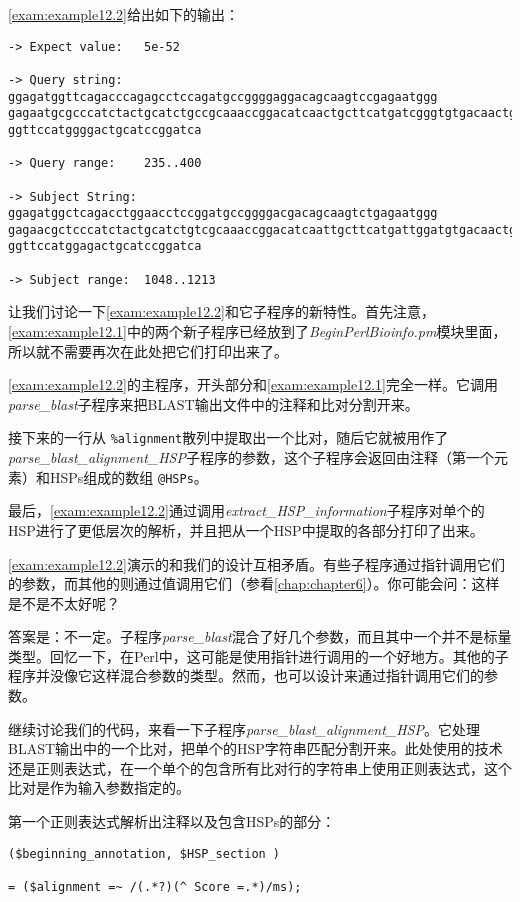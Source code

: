 \autoref{exam:example12.2}给出如下的输出：

\begin{lstlisting}
-> Expect value:   5e-52

-> Query string:   ggagatggttcagacccagagcctccagatgccggggaggacagcaagtccgagaatggg
gagaatgcgcccatctactgcatctgccgcaaaccggacatcaactgcttcatgatcgggtgtgacaactgcaatgagt
ggttccatggggactgcatccggatca

-> Query range:    235..400

-> Subject String: ggagatggctcagacctggaacctccggatgccggggacgacagcaagtctgagaatggg
gagaacgctcccatctactgcatctgtcgcaaaccggacatcaattgcttcatgattggatgtgacaactgcaacgagt
ggttccatggagactgcatccggatca

-> Subject range:  1048..1213
\end{lstlisting}

让我们讨论一下\autoref{exam:example12.2}和它子程序的新特性。首先注意，\autoref{exam:example12.1}中的两个新子程序已经放到了\textit{BeginPerlBioinfo.pm}模块里面，所以就不需要再次在此处把它们打印出来了。

\autoref{exam:example12.2}的主程序，开头部分和\autoref{exam:example12.1}完全一样。它调用\textit{parse\_blast}子程序来把BLAST输出文件中的注释和比对分割开来。

接下来的一行从 \verb|%alignment|散列中提取出一个比对，随后它就被用作了\textit{parse\_blast\_alignment\_HSP}子程序的参数，这个子程序会返回由注释（第一个元素）和HSPs组成的数组 \verb|@HSPs|。

最后，\autoref{exam:example12.2}通过调用\textit{extract\_HSP\_information}子程序对单个的HSP进行了更低层次的解析，并且把从一个HSP中提取的各部分打印了出来。

\autoref{exam:example12.2}演示的和我们的设计互相矛盾。有些子程序通过指针调用它们的参数，而其他的则通过值调用它们（参看\autoref{chap:chapter6}）。你可能会问：这样是不是不太好呢？

答案是：不一定。子程序\textit{parse\_blast}混合了好几个参数，而且其中一个并不是标量类型。回忆一下，在Perl中，这可能是使用指针进行调用的一个好地方。其他的子程序并没像它这样混合参数的类型。然而，也可以设计来通过指针调用它们的参数。

继续讨论我们的代码，来看一下子程序\textit{parse\_blast\_alignment\_HSP}。它处理BLAST输出中的一个比对，把单个的HSP字符串匹配分割开来。此处使用的技术还是正则表达式，在一个单个的包含所有比对行的字符串上使用正则表达式，这个比对是作为输入参数指定的。

第一个正则表达式解析出注释以及包含HSPs的部分：

\begin{lstlisting}
($beginning_annotation, $HSP_section )

= ($alignment =~ /(.*?)(^ Score =.*)/ms);
\end{lstlisting}

